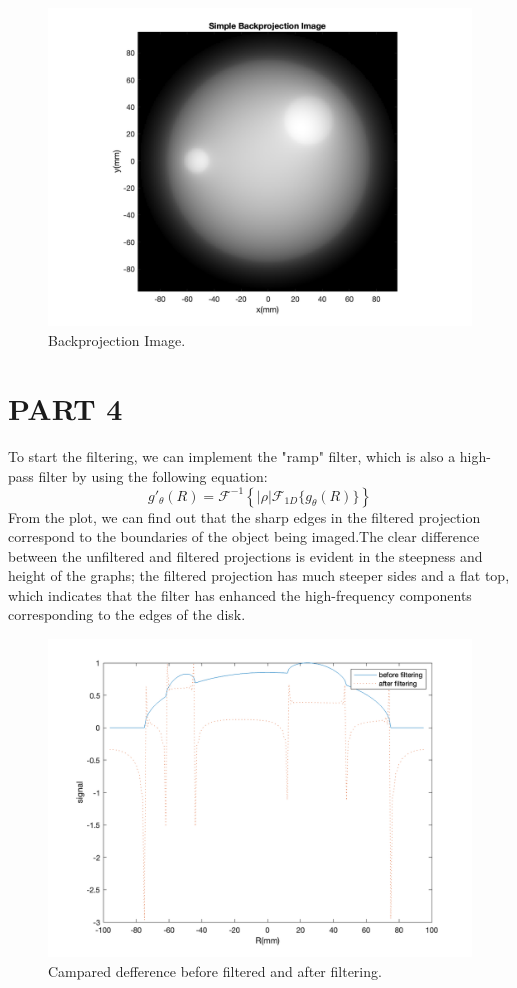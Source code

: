 \documentclass{report}
\begin{document}
\begin{figure}[hb]
    \centering
    \includegraphics[width=1\textwidth]{3.png}
    \caption{Backprojection Image.}
\end{figure}  
\newpage

\section[short]{PART 4}
To start the filtering, we can implement the "ramp" filter, which is also a 
high-pass filter by using the following equation:
\[
g'_{\theta}(R) = \mathcal{F}^{-1}\left\{ |\rho| \mathcal{F}_{1D} \{ g_{\theta}(R) \} \right\}
\]
From the plot, we can find out that the sharp edges in the filtered projection 
correspond to the boundaries of the object being imaged.The clear difference 
between the unfiltered and filtered projections is evident in the steepness and 
height of the graphs; the filtered projection has much steeper sides and a flat top,
which indicates that the filter has enhanced the high-frequency components corresponding
to the edges of the disk.
\begin{figure}[hb]
    \centering
    \includegraphics[width=1\textwidth]{4.png}
    \caption{Campared defference before filtered and after filtering.}
\end{figure}
\newpage  
\end{document}
